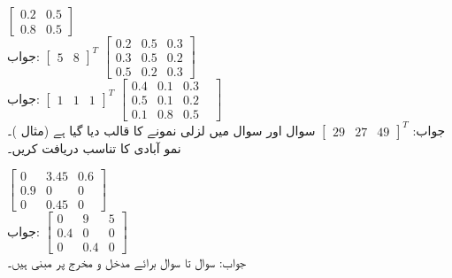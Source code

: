 \quad
$\begin{bmatrix}0.2&0.5\\0.8&0.5  \end{bmatrix}$\\
جواب:
$\begin{bmatrix}5&8 \end{bmatrix}^T$
\quad
$\begin{bmatrix}0.2&0.5&0.3\\0.3&0.5&0.2 \\0.5&0.2&0.3 \end{bmatrix}$\\
جواب:
$\begin{bmatrix}1&1&1 \end{bmatrix}^T$
\quad
$\begin{bmatrix}0.4&0.1&0.3\\0.5&0.1&0.2& \\0.1&0.8&0.5 \end{bmatrix}$\\
جواب:
$\begin{bmatrix}29&27&49 \end{bmatrix}^T$
سوال  اور سوال  میں لزلی نمونے کا قالب  دیا گیا ہے (مثال )۔نمو آبادی کا تناسب دریافت کریں۔

\quad
$\begin{bmatrix}0&3.45&0.6\\0.9&0&0\\0&0.45&0 \end{bmatrix}$\\
جواب:
\quad
$\begin{bmatrix}0&9&5\\0.4&0&0\\0&0.4&0 \end{bmatrix}$\\
جواب:
سوال  تا سوال    برائے مدخل و مخرج پر مبنی ہیں۔

